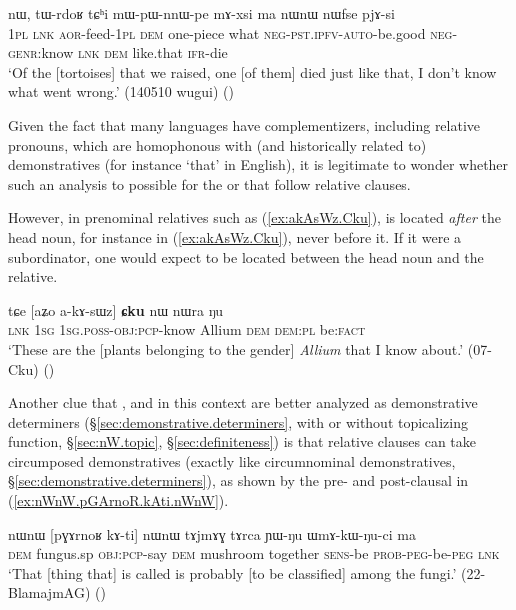 \begin{exe}
\ex \label{ex:pWXsuj.nW}
 nɯ, tɯ-rdoʁ tɕʰi mɯ-pɯ-nnɯ-pe mɤ-xsi ma nɯnɯ nɯfse pjɤ-si \\
\textsc{1pl} \textsc{lnk} \textsc{aor}-feed-\textsc{1pl} \textsc{dem} one-piece what \textsc{neg}-\textsc{pst}.\textsc{ipfv}-\textsc{auto}-be.good \textsc{neg}-\textsc{genr}:know \textsc{lnk} \textsc{dem} like.that \textsc{ifr}-die \\
\glt `Of the [tortoises] that we raised, one [of them] died just like that, I don't know what went wrong.' (140510 wugui)
()
\end{exe}  

Given the fact that many languages have complementizers, including relative pronouns, which are homophonous with (and historically related to) demonstratives (for instance `that' in English), it is legitimate to wonder whether such an analysis to possible for the  or  that follow relative clauses.

However, in prenominal relatives such as (\ref{ex:akAsWz.Cku}),  is located \textit{after} the head noun, for instance  in (\ref{ex:akAsWz.Cku}), never before it. If it were a subordinator, one would expect  to be located between the head noun and the relative.

\begin{exe}
\ex \label{ex:akAsWz.Cku}
\gll   tɕe [aʑo a-kɤ-sɯz] \textbf{ɕku} nɯ nɯra ŋu \\
\textsc{lnk} \textsc{1sg} \textsc{1sg}.\textsc{poss}-\textsc{obj}:\textsc{pcp}-know Allium \textsc{dem} \textsc{dem}:\textsc{pl} be:\textsc{fact} \\
\glt `These are the [plants belonging to the gender] \textit{Allium} that I know about.' (07-Cku)
()
\end{exe}  

Another clue that ,  and  in this context are better analyzed as demonstrative determiners (§\ref{sec:demonstrative.determiners}, with or without topicalizing function, §\ref{sec:nW.topic}, §\ref{sec:definiteness}) is that relative clauses can take circumposed demonstratives (exactly like circumnominal demonstratives, §\ref{sec:demonstrative.determiners}), as shown by the pre- and post-clausal  in (\ref{ex:nWnW.pGArnoR.kAti.nWnW}).

\begin{exe}
\ex \label{ex:nWnW.pGArnoR.kAti.nWnW}
\gll nɯnɯ [pɣɤrnoʁ kɤ-ti] nɯnɯ tɤjmɤɣ tɤrca ɲɯ-ŋu ɯmɤ-kɯ-ŋu-ci ma \\
\textsc{dem} fungus.sp \textsc{obj}:\textsc{pcp}-say \textsc{dem} mushroom together \textsc{sens}-be \textsc{prob}-\textsc{peg}-be-\textsc{peg} \textsc{lnk} \\
\glt `That [thing that] is called  is probably [to be classified] among the fungi.' (22-BlamajmAG)
()
\end{exe}  

